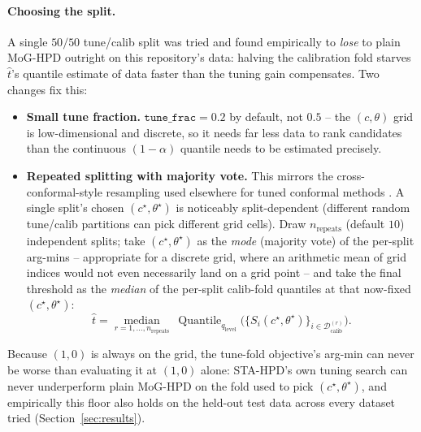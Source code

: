 \documentclass[11pt]{article}
\begin{document}
\paragraph{Choosing the split.} A single $50/50$ tune/calib split was tried and found empirically
to \emph{lose} to plain MoG-HPD outright on this repository's data: halving the calibration fold
starves $\hat t$'s quantile estimate of data faster than the tuning gain compensates. Two changes
fix this:
\begin{itemize}[leftmargin=1.5em]
\item \textbf{Small tune fraction.} $\texttt{tune\_frac}=0.2$ by default, not $0.5$ -- the
$(c,\theta)$ grid is low-dimensional and discrete, so it needs far less data to rank candidates
than the continuous $(1-\alpha)$ quantile needs to be estimated precisely.
\item \textbf{Repeated splitting with majority vote.} This mirrors the cross-conformal-style
resampling used elsewhere for tuned conformal methods \cite{gibbs2021adaptive}. A single split's
chosen $(c^\star,\theta^\star)$
is noticeably split-dependent (different random tune/calib partitions can pick different grid
cells). Draw $n_{\mathrm{repeats}}$ (default $10$) independent splits; take $(c^\star,\theta^\star)$
as the \emph{mode} (majority vote) of the per-split arg-mins -- appropriate for a discrete grid,
where an arithmetic mean of grid indices would not even necessarily land on a grid point -- and
take the final threshold as the \emph{median} of the per-split calib-fold quantiles at that now-fixed
$(c^\star,\theta^\star)$:
\begin{equation}
\hat t = \operatorname*{median}_{r=1,\dots,n_{\mathrm{repeats}}}\
\operatorname{Quantile}_{q_{\mathrm{level}}}\Big(\big\{S_i(c^\star,\theta^\star)\big\}_{i\in\mathcal
D_{\mathrm{calib}}^{(r)}}\Big).
\label{eq:medianquantile}
\end{equation}
\end{itemize}
Because $(1,0)$ is always on the grid, the tune-fold objective's arg-min can never be worse than
evaluating it at $(1,0)$ alone: STA-HPD's own tuning search can never underperform plain MoG-HPD
on the fold used to pick $(c^\star,\theta^\star)$, and empirically this floor also holds on the
held-out test data across every dataset tried (Section~\ref{sec:results}).
\end{document}
